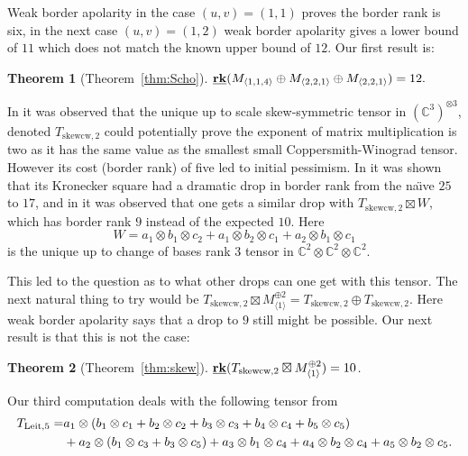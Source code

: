 \documentclass[12pt]{amsart}
\newtheorem{theorem}{Theorem}[section]
\theoremstyle{definition}
\theoremstyle{remark}
\theoremstyle{definition}
\newcommand{\brk}{{\underline{{\bf rk}}}}
\newcommand{\CC}{\mathbb{C}}
\begin{document}
Weak border apolarity in the case $(u,v)=(1,1)$ proves the border rank is six, 
in the next case $(u,v)=(1,2)$ weak border apolarity gives a lower bound of $11$ which
does not match the known upper bound of $12$.
Our first result is:
\begin{theorem}[Theorem~\ref{thm:Scho}] $\brk(M_{\langle 1, 1, 4\rangle}  \oplus M_{\langle 2,2,1\rangle} \oplus M_{\langle 2 ,2,1\rangle} )=12.$
\end{theorem}

In \cite{CGLV22} it was observed that the unique up to scale skew-symmetric tensor in $(\CC^3)^{\otimes 3}$, denoted
$T_{\mathrm{skewcw},2}$ could potentially prove the exponent of matrix multiplication is two as it has the same value as the smallest small
Coppersmith-Winograd tensor. However its cost (border rank) of five led to initial pessimism.
In \cite{chl19} it was shown that its Kronecker square had a dramatic drop in border rank from
the na\"\i ve $25$ to $17$, and in \cite{HL26} it was observed that one gets a similar drop with 
$T_{\mathrm{skewcw},2}\boxtimes W$, which has border rank $9$ instead of the expected $10$.
Here 
\begin{equation}\label{eq:Wtensor}
W = a_1\otimes b_1\otimes c_2 + a_1\otimes b_2\otimes c_1 + a_2\otimes b_1\otimes c_1
\end{equation}
is the unique up to change of bases rank $3$ tensor in $\CC^2\otimes \CC^2\otimes \CC^2$. 

This led to the question as to what other drops can one get with this tensor.
The next natural thing to try would be 
$T_{\mathrm{skewcw},2}\boxtimes M_{\langle 1\rangle}^{\oplus 2}= T_{\mathrm{skewcw},2}\oplus T_{\mathrm{skewcw},2}$.
Here weak border apolarity says that a drop to $9$ still might be possible. Our next result
is that this is not the case:

\begin{theorem}[Theorem~\ref{thm:skew}] $\brk(T_{\mathrm{skewcw},2}\boxtimes M_{\langle 1\rangle}^{\oplus 2})=10$.
\end{theorem}

Our third computation deals with the following tensor from \cite[Definition~17]{Lei16}
\begin{align}\label{eq:Leitner}
T_{\mathrm{Leit},{5}} = &a_1 \otimes (b_1 \otimes c_1 + b_2 \otimes  c_2 + b_3 \otimes c_3 + b_4 \otimes  c_4 + b_5\otimes c_5)\\
& + a_2 \otimes (b_1 \otimes c_3 + b_3 \otimes c_5) + a_3 \otimes b_1 \otimes c_4 + a_4 \otimes b_2 \otimes c_4 + a_5 \otimes b_2 \otimes c_5.\notag
\end{align}
\end{document}
